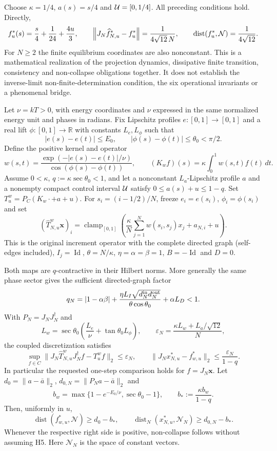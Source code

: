 \begin{example}\label{ex:common-bridge-witness}
Choose $\kappa=1/4$, $a(s)=s/4$ and $\mathcal{U}=[0,1/4]$. All preceding conditions hold. Directly,
\[
f_u^\ast(s)=\frac{s}{4}+\frac1{24}+\frac{4u}{3},\qquad
\left\lVert J_N\widehat f_{N,u}^\ast-f_u^\ast \right\rVert
=\frac{1}{4\sqrt{12}\,N},\qquad
\operatorname{dist}(f_u^\ast,\mathcal N)=\frac1{4\sqrt{12}}.
\]
For $N\geq2$ the finite equilibrium coordinates are also nonconstant. This is a mathematical realization of the projection dynamics, dissipative finite transition, consistency and non-collapse obligations together. It does not establish the inverse-limit non-finite-determination condition, the six operational invariants or a phenomenal bridge.
\end{example}

\begin{proposition}\label{prop:coupled-energy-phase-bridge}
Let $\nu=kT>0$, with energy coordinates and $\nu$ expressed in the same normalized energy unit and phases in radians. Fix Lipschitz profiles $e:[0,1]\to[0,1]$ and a real lift
$\phi:[0,1]\to\mathbb R$ with constants $L_e,L_\phi$ such that
\[
 |e(s)-e(t)|\leq E_0,\qquad
 |\phi(s)-\phi(t)|\leq\theta_0<\pi/2.
\]
Define the positive kernel and operator
\[
 w(s,t)=\frac{\exp(-|e(s)-e(t)|/\nu)}{\cos(\phi(s)-\phi(t))},
 \qquad (K_wf)(s)=\kappa\int_0^1w(s,t)f(t)\,dt.
\]
Assume $0<\kappa$, $q:=\kappa\sec\theta_0<1$, and let a nonconstant
$L_a$-Lipschitz profile $a$ and a nonempty compact control interval $\mathcal{U}$ satisfy
$0\leq a(s)+u\leq1-q$. Set $T^w_u=P_C(K_w\cdot+a+u)$.
For $s_i=(i-1/2)/N$, freeze $e_i=e(s_i)$, $\phi_i=\phi(s_i)$ and set
\[
 (\widehat T^w_{N,u}\mathbf x)_i
 =\operatorname{clamp}_{[0,1]}
 \left(\frac\kappa N\sum_{j=1}^Nw(s_i,s_j)x_j+a_{N,i}+u\right).
\]
This is the original increment operator with the complete directed graph
(self-edges included), $I_j=\operatorname{Id}$, $\theta=N/\kappa$,
$\eta=\alpha=\beta=1$, $B=-\operatorname{Id}$ and $D=0$.

Both maps are $q$-contractive in their Hilbert norms. More generally the
same phase sector gives the sufficient directed-graph factor
\[
 q_N=|1-\alpha\beta|
 +\frac{\eta L_I\sqrt{d_N^{\rm in}d_N^{\rm out}}}{\theta\cos\theta_0}
 +\alpha L_D<1.
\]
With $P_N=J_NJ_N^\dagger$ and
\[
 L_w=\sec\theta_0\left(\frac{L_e}{\nu}+\tan\theta_0 L_\phi\right),
 \qquad \varepsilon_N=\frac{\kappa L_w+L_a/\sqrt{12}}{N},
\]
the coupled discretization satisfies
\[
 \sup_{f\in C}\|J_N\widehat T^w_{N,u}J_N^\dagger f-T^w_uf\|_2
 \leq\varepsilon_N,
 \qquad
 \|J_Nx^*_{N,u}-f^*_{w,u}\|_2\leq\frac{\varepsilon_N}{1-q}.
\]
In particular the requested one-step comparison holds for $f=J_N\mathbf x$.
Let $d_0=\|a-\bar a\|_2$, $d_{0,N}=\|P_Na-\bar a\|_2$ and
\[
 b_w=\max\{1-e^{-E_0/\nu},\sec\theta_0-1\},
 \qquad b_*:=\frac{\kappa b_w}{1-q}.
\]
Then, uniformly in $u$,
\[
 \operatorname{dist}(f^*_{w,u},\mathcal N)\geq d_0-b_* ,\qquad
 \operatorname{dist}_N(x^*_{N,u},\mathcal N_N)\geq d_{0,N}-b_* .
\]
Whenever the respective right side is positive, non-collapse follows without
assuming H5. Here $\mathcal N_N$ is the space of constant vectors.


\end{proposition}
